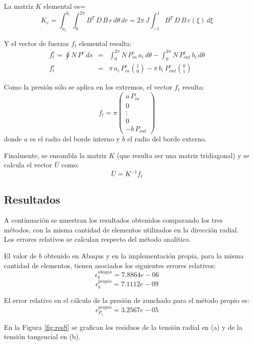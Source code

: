 La matriz $K$ elemental es=
\begin{equation}
K_e=\int_{a_i}^{b_i}\int_{0}^{2\pi}B^T\,D\,B\,r\,d\theta\,dr
=2\pi\,J\int_{-1}^{1}B^T\,D\,B\,r(\xi)\,d\xi
\end{equation}

Y el vector de fuerzas $f_t$ elemental resulta:
\begin{eqnarray}
f_t^e=\oint N\,P^e\,ds&=&\int_{0}^{2\pi} N\,P_{in}^e\,a_i\,d\theta- \int_{0}^{2\pi} N\,P_{out}^e\,b_i\,d\theta\nonumber\\
f_t^e&=&\pi\,a_i\,P_{in}^e\binom{1}{0}-\pi\,b_i\,P_{out}^e\binom{0}{1}
\end{eqnarray}

Como la presi\'on s\'olo se aplica en los extremos, el vector $f_t$ resulta:
\begin{equation}
f_t=
\pi
\begin{pmatrix}
a\,P_{in}\\
0\\
\vdots\\
0\\
-b\,P_{out}
\end{pmatrix}
\end{equation}
donde $a$ es el radio del borde interno y $b$ el radio del borde externo.

Finalmente, se ensambla la matriz $K$ (que resulta ser una matriz tridiagonal) y se calcula el vector $\bar{U}$ como:
\begin{equation}
\bar{U}=K^{-1}f_t
\end{equation}

\subsection{Resultados}
\label{Result1}
A continuaci\'on se muestran los resultados obtenidos comparando los tres m\'etodos, con la misma cantidad de elementos utilizados en la direcci\'on radial. Los errores relativos se calculan respecto del m\'etodo anal\'itico.

El valor de $b$ obtenido en Abaqus y en la implementaci\'on propia, para la misma cantidad de elementos, tienen asociados los siguientes errores relativos:
$$ \epsilon_b^{abaqus}=7.8864e-06 $$
$$ \epsilon_b^{propio}=7.1112e-09 $$

El error relativo en el c\'alculo de la presi\'on de zunchado para el m\'etodo propio es:
$$ \epsilon_{P_z}^{propio}=3.2567e-05$$

En la Figura \ref{fig:resS} se grafican los residuos de la tensi\'on radial en (a) y de la tensi\'on tangencial en (b).

